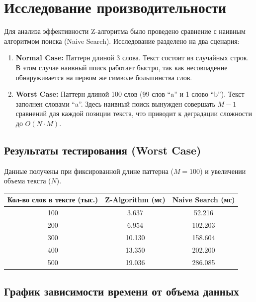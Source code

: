 \documentclass[unicode, 12pt, a4paper,oneside,fleqn]{article}
\begin{document}
\pagebreak

\section{Исследование производительности}

Для анализа эффективности Z-алгоритма было проведено сравнение с наивным алгоритмом поиска (Naive Search). Исследование разделено на два сценария:

\begin{enumerate}
    \item \textbf{Normal Case:} Паттерн длиной 3 слова. Текст состоит из случайных строк. В этом случае наивный поиск работает быстро, так как несовпадение обнаруживается на первом же символе большинства слов.
    \item \textbf{Worst Case:} Паттерн длиной 100 слов (99 слов \enquote{a} и 1 слово \enquote{b}). Текст заполнен словами \enquote{a}. Здесь наивный поиск вынужден совершать $M-1$ сравнений для каждой позиции текста, что приводит к деградации сложности до $O(N \cdot M)$.
\end{enumerate}

\subsection{Результаты тестирования (Worst Case)}
Данные получены при фиксированной длине паттерна ($M=100$) и увеличении объема текста ($N$).

\begin{center}
\begin{tabular}{|c|c|c|}
\hline
Кол-во слов в тексте (тыс.) & Z-Algorithm (мс) & Naive Search (мс) \\ \hline
100 & 3.637 & 52.216 \\ \hline
200 & 6.954 & 102.203 \\ \hline
300 & 10.130 & 158.604 \\ \hline
400 & 13.350 & 202.200 \\ \hline
500 & 19.036 & 286.085 \\ \hline
\end{tabular}
\end{center}

\subsection{График зависимости времени от объема данных}
\end{document}
